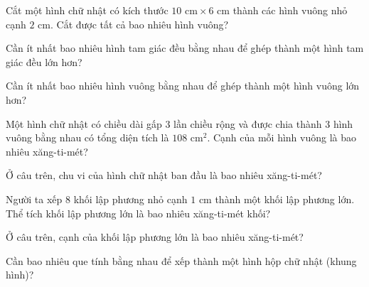 \begin{ex}
  Cắt một hình chữ nhật có kích thước $10\text{ cm} \times 6\text{ cm}$ thành các hình vuông nhỏ cạnh $2\text{ cm}$. Cắt được tất cả bao nhiêu hình vuông?
\end{ex}

\begin{ex}
  Cần ít nhất bao nhiêu hình tam giác đều bằng nhau để ghép thành một hình tam giác đều lớn hơn?
\end{ex}

\begin{ex}
  Cần ít nhất bao nhiêu hình vuông bằng nhau để ghép thành một hình vuông lớn hơn?
\end{ex}

\begin{ex}
  Một hình chữ nhật có chiều dài gấp 3 lần chiều rộng và được chia thành 3 hình vuông bằng nhau có tổng diện tích là $108\text{ cm}^2$. Cạnh của mỗi hình vuông là bao nhiêu xăng-ti-mét?
\end{ex}

\begin{ex}
  Ở câu trên, chu vi của hình chữ nhật ban đầu là bao nhiêu xăng-ti-mét?
\end{ex}

\begin{ex}
  Người ta xếp $8$ khối lập phương nhỏ cạnh $1\text{ cm}$ thành một khối lập phương lớn. Thể tích khối lập phương lớn là bao nhiêu xăng-ti-mét khối?
\end{ex}

\begin{ex}
  Ở câu trên, cạnh của khối lập phương lớn là bao nhiêu xăng-ti-mét?
\end{ex}

\begin{ex}
  Cần bao nhiêu que tính bằng nhau để xếp thành một hình hộp chữ nhật (khung hình)?
\end{ex}

